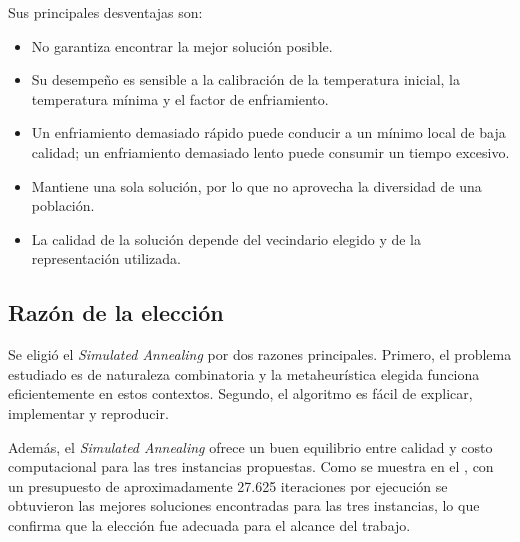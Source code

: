 Sus principales desventajas son:

\begin{itemize}
    \item No garantiza encontrar la mejor solución posible.
    \item Su desempeño es sensible a la calibración de la temperatura inicial, la temperatura mínima y el factor de enfriamiento.
    \item Un enfriamiento demasiado rápido puede conducir a un mínimo local de baja calidad; un enfriamiento demasiado lento puede consumir un tiempo excesivo.
    \item Mantiene una sola solución, por lo que no aprovecha la diversidad de una población.
    \item La calidad de la solución depende del vecindario elegido y de la representación utilizada.
\end{itemize}

\subsection{Razón de la elección}

Se eligió el \emph{Simulated Annealing} por dos razones principales.
Primero, el problema estudiado es de naturaleza combinatoria y
la metaheurística elegida funciona eficientemente en estos contextos.
Segundo, el algoritmo es fácil de explicar, implementar y reproducir.

Además, el \emph{Simulated Annealing} ofrece un buen equilibrio entre calidad y
costo computacional para las tres instancias propuestas.
Como se muestra en el ,
con un presupuesto de aproximadamente 27.625 iteraciones por ejecución se obtuvieron las mejores soluciones encontradas para las tres instancias,
lo que confirma que la elección fue adecuada para el alcance del trabajo.
